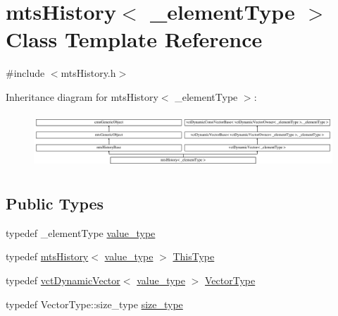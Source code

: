 \hypertarget{classmts_history}{}\section{mts\+History$<$ \+\_\+element\+Type $>$ Class Template Reference}
\label{classmts_history}


{\ttfamily \#include $<$mts\+History.\+h$>$}

Inheritance diagram for mts\+History$<$ \+\_\+element\+Type $>$\+:\begin{figure}[H]
\begin{center}
\leavevmode
\includegraphics[height=2.077922cm]{db/db7/classmts_history}
\end{center}
\end{figure}
\subsection*{Public Types}
\begin{DoxyCompactItemize}
\item 
typedef \+\_\+element\+Type \hyperlink{classmts_history_a83c4704404e2b71933b53c184bf72e8f}{value\+\_\+type}
\item 
typedef \hyperlink{classmts_history}{mts\+History}$<$ \hyperlink{classmts_history_a83c4704404e2b71933b53c184bf72e8f}{value\+\_\+type} $>$ \hyperlink{classmts_history_aacbd58dfe7cfbae30858ab99557ee181}{This\+Type}
\item 
typedef \hyperlink{classvct_dynamic_vector}{vct\+Dynamic\+Vector}$<$ \hyperlink{classmts_history_a83c4704404e2b71933b53c184bf72e8f}{value\+\_\+type} $>$ \hyperlink{classmts_history_a7ccb818e85025368eb6ccdb5423453a3}{Vector\+Type}
\item 
typedef Vector\+Type\+::size\+\_\+type \hyperlink{classmts_history_aca985b1dbd39cc61816674edc9aee0cc}{size\+\_\+type}
\end{DoxyCompactItemize}
